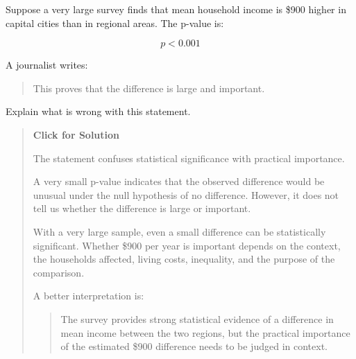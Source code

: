 \documentclass[
  letterpaper,
  DIV=11,
  numbers=noendperiod]{scrreprt}
\begin{document}
\begin{tcolorbox}[enhanced jigsaw, arc=.35mm, bottomrule=.15mm, bottomtitle=1mm, breakable, colback=white, colbacktitle=quarto-callout-note-color!10!white, colframe=quarto-callout-note-color-frame, coltitle=black, left=2mm, leftrule=.75mm, opacityback=0, opacitybacktitle=0.6, rightrule=.15mm, title=\textcolor{quarto-callout-note-color}{\faInfo}\hspace{0.5em}{Question 6}, titlerule=0mm, toprule=.15mm, toptitle=1mm]

Suppose a very large survey finds that mean household income is \$900
higher in capital cities than in regional areas. The p-value is:

\[
p < 0.001
\]

A journalist writes:

\begin{quote}
This proves that the difference is large and important.
\end{quote}

Explain what is wrong with this statement.

\begin{quote}
\textbf{Click for Solution}

The statement confuses statistical significance with practical
importance.

A very small p-value indicates that the observed difference would be
unusual under the null hypothesis of no difference. However, it does not
tell us whether the difference is large or important.

With a very large sample, even a small difference can be statistically
significant. Whether \$900 per year is important depends on the context,
the households affected, living costs, inequality, and the purpose of
the comparison.

A better interpretation is:

\begin{quote}
The survey provides strong statistical evidence of a difference in mean
income between the two regions, but the practical importance of the
estimated \$900 difference needs to be judged in context.
\end{quote}
\end{quote}

\end{tcolorbox}
\end{document}
